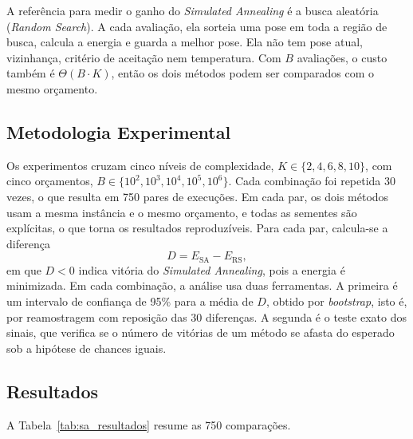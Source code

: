 \documentclass[conference]{IEEEtran}
\theoremstyle{definition}
\theoremstyle{plain}
\begin{document}
A referência para medir o ganho do \textit{Simulated Annealing} é a busca aleatória (\textit{Random Search}). A cada avaliação, ela sorteia uma pose em toda a região de busca, calcula a energia e guarda a melhor pose. Ela não tem pose atual, vizinhança, critério de aceitação nem temperatura. Com $B$ avaliações, o custo também é $\Theta(B \cdot K)$, então os dois métodos podem ser comparados com o mesmo orçamento.

\subsection{Metodologia Experimental}
\label{subsec:metodologia}

Os experimentos cruzam cinco níveis de complexidade, $K \in \{2, 4, 6, 8, 10\}$, com cinco orçamentos, $B \in \{10^2, 10^3, 10^4, 10^5, 10^6\}$. Cada combinação foi repetida 30 vezes, o que resulta em 750 pares de execuções. Em cada par, os dois métodos usam a mesma instância e o mesmo orçamento, e todas as sementes são explícitas, o que torna os resultados reproduzíveis. Para cada par, calcula-se a diferença
\begin{equation}
D = E_{\text{SA}} - E_{\text{RS}},
\end{equation}
em que $D < 0$ indica vitória do \textit{Simulated Annealing}, pois a energia é minimizada. Em cada combinação, a análise usa duas ferramentas. A primeira é um intervalo de confiança de 95\% para a média de $D$, obtido por \textit{bootstrap}, isto é, por reamostragem com reposição das 30 diferenças. A segunda é o teste exato dos sinais, que verifica se o número de vitórias de um método se afasta do esperado sob a hipótese de chances iguais.

\subsection{Resultados}
\label{subsec:resultados}

A Tabela~\ref{tab:sa_resultados} resume as 750 comparações.
\end{document}
